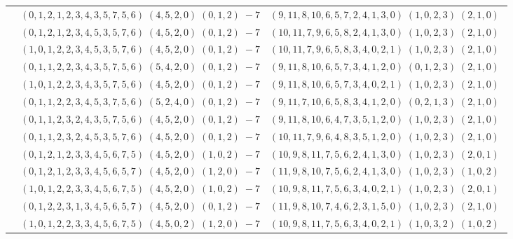 \documentclass[11pt]{article}
\begin{document}
\begin{longtable}[l]{|c|c|c|}
 \cline{2-3} 
 & $(0 ,1 ,2 ,1 ,2 ,3 ,4 ,3 ,5 ,7 ,5 ,6) \;(4 ,5 ,2 ,0) \;(0 ,1 ,2) \;-7$ & $(9 ,11 ,8 ,10 ,6 ,5 ,7 ,2 ,4 ,1 ,3 ,0) \;(1 ,0 ,2 ,3) \;(2 ,1 ,0) \;$\\ 
 \cline{2-3} 
 & $(0 ,1 ,2 ,1 ,2 ,3 ,4 ,5 ,3 ,5 ,7 ,6) \;(4 ,5 ,2 ,0) \;(0 ,1 ,2) \;-7$ & $(10 ,11 ,7 ,9 ,6 ,5 ,8 ,2 ,4 ,1 ,3 ,0) \;(1 ,0 ,2 ,3) \;(2 ,1 ,0) \;$\\ 
 \cline{2-3} 
 & $(1 ,0 ,1 ,2 ,2 ,3 ,4 ,5 ,3 ,5 ,7 ,6) \;(4 ,5 ,2 ,0) \;(0 ,1 ,2) \;-7$ & $(10 ,11 ,7 ,9 ,6 ,5 ,8 ,3 ,4 ,0 ,2 ,1) \;(1 ,0 ,2 ,3) \;(2 ,1 ,0) \;$\\ 
 \cline{2-3} 
 & $(0 ,1 ,1 ,2 ,2 ,3 ,4 ,3 ,5 ,7 ,5 ,6) \;(5 ,4 ,2 ,0) \;(0 ,1 ,2) \;-7$ & $(9 ,11 ,8 ,10 ,6 ,5 ,7 ,3 ,4 ,1 ,2 ,0) \;(0 ,1 ,2 ,3) \;(2 ,1 ,0) \;$\\ 
 \cline{2-3} 
 & $(1 ,0 ,1 ,2 ,2 ,3 ,4 ,3 ,5 ,7 ,5 ,6) \;(4 ,5 ,2 ,0) \;(0 ,1 ,2) \;-7$ & $(9 ,11 ,8 ,10 ,6 ,5 ,7 ,3 ,4 ,0 ,2 ,1) \;(1 ,0 ,2 ,3) \;(2 ,1 ,0) \;$\\ 
 \cline{2-3} 
 & $(0 ,1 ,1 ,2 ,2 ,3 ,4 ,5 ,3 ,7 ,5 ,6) \;(5 ,2 ,4 ,0) \;(0 ,1 ,2) \;-7$ & $(9 ,11 ,7 ,10 ,6 ,5 ,8 ,3 ,4 ,1 ,2 ,0) \;(0 ,2 ,1 ,3) \;(2 ,1 ,0) \;$\\ 
 \cline{2-3} 
 & $(0 ,1 ,1 ,2 ,3 ,2 ,4 ,3 ,5 ,7 ,5 ,6) \;(4 ,5 ,2 ,0) \;(0 ,1 ,2) \;-7$ & $(9 ,11 ,8 ,10 ,6 ,4 ,7 ,3 ,5 ,1 ,2 ,0) \;(1 ,0 ,2 ,3) \;(2 ,1 ,0) \;$\\ 
 \cline{2-3} 
 & $(0 ,1 ,1 ,2 ,3 ,2 ,4 ,5 ,3 ,5 ,7 ,6) \;(4 ,5 ,2 ,0) \;(0 ,1 ,2) \;-7$ & $(10 ,11 ,7 ,9 ,6 ,4 ,8 ,3 ,5 ,1 ,2 ,0) \;(1 ,0 ,2 ,3) \;(2 ,1 ,0) \;$\\ 
 \cline{2-3} 
 & $(0 ,1 ,2 ,1 ,2 ,3 ,3 ,4 ,5 ,6 ,7 ,5) \;(4 ,5 ,2 ,0) \;(1 ,0 ,2) \;-7$ & $(10 ,9 ,8 ,11 ,7 ,5 ,6 ,2 ,4 ,1 ,3 ,0) \;(1 ,0 ,2 ,3) \;(2 ,0 ,1) \;$\\ 
 \cline{2-3} 
 & $(0 ,1 ,2 ,1 ,2 ,3 ,3 ,4 ,5 ,6 ,5 ,7) \;(4 ,5 ,2 ,0) \;(1 ,2 ,0) \;-7$ & $(11 ,9 ,8 ,10 ,7 ,5 ,6 ,2 ,4 ,1 ,3 ,0) \;(1 ,0 ,2 ,3) \;(1 ,0 ,2) \;$\\ 
 \cline{2-3} 
 & $(1 ,0 ,1 ,2 ,2 ,3 ,3 ,4 ,5 ,6 ,7 ,5) \;(4 ,5 ,2 ,0) \;(1 ,0 ,2) \;-7$ & $(10 ,9 ,8 ,11 ,7 ,5 ,6 ,3 ,4 ,0 ,2 ,1) \;(1 ,0 ,2 ,3) \;(2 ,0 ,1) \;$\\ 
 \cline{2-3} 
 & $(0 ,1 ,2 ,2 ,3 ,1 ,3 ,4 ,5 ,6 ,5 ,7) \;(4 ,5 ,2 ,0) \;(0 ,1 ,2) \;-7$ & $(11 ,9 ,8 ,10 ,7 ,4 ,6 ,2 ,3 ,1 ,5 ,0) \;(1 ,0 ,2 ,3) \;(2 ,1 ,0) \;$\\ 
 \cline{2-3} 
 & $(1 ,0 ,1 ,2 ,2 ,3 ,3 ,4 ,5 ,6 ,7 ,5) \;(4 ,5 ,0 ,2) \;(1 ,2 ,0) \;-7$ & $(10 ,9 ,8 ,11 ,7 ,5 ,6 ,3 ,4 ,0 ,2 ,1) \;(1 ,0 ,3 ,2) \;(1 ,0 ,2) \;$\\ 

\end{longtable}
\end{document}
